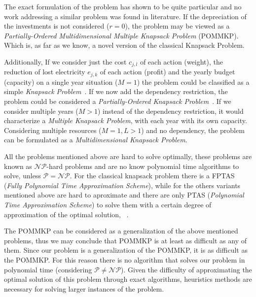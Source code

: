 The exact formulation of the problem has shown to be quite particular and
no work addressing a similar problem was found in literature.
If the depreciation of the investments is not considered ($r=0$),
the problem may  be viewed as a \textit{Partially-Ordered Multidimensional
Multiple Knapsack Problem} (POMMKP). Which is, as far as we know, a
novel version of the classical Knapsack Problem.

Additionally, If we consider just the cost $c_{j,l}$ of each action (weight), the
reduction of lost electricity  $e_{j,k}$ of each action (profit) and the yearly budget (capacity)
on a single year situation ($M=1$) the problem could be classified as a simple
\textit{Knapsack Problem}~\cite{pisinger1995}.
If we now add the dependency restriction, the problem could be considered
a \textit{Partially-Ordered Knapsack Problem}~\cite{pok2002}.
If we consider multiple years ($M > 1$) instead of the dependency restriction, it would characterize
a \textit{Multiple Knapsack Problem}, with each year with its own capacity.
Considering multiple resources ($M=1, L > 1$) and no dependency, the problem can be formulated as a
\textit{Multidimensional Knapsack Problem}.

All the problems mentioned above are hard to solve optimally, these problems are known 
as $\mathcal{NP}$-hard problems and are no know polynomial time algorithms to solve, unless $\mathcal{P} = \mathcal{NP}$.
For the classical knapsack problem there is a FPTAS (\textit{Fully Polynomial Time Approximation Scheme}),
while for the others variants mentioned above are hard to aproximate and there are only PTAS 
(\textit{Polynomial Time Approximation Scheme}) to solve them with a certain degree of 
approximation of the optimal solution, ~\cite{pok2002, puchinger2006core, dawande2000approximation}. 

The POMMKP can be considered as a generalization of the above mentioned problems,
thus we may conclude that POMMKP is at least as difficult as any of them.
Since our problem is a generalization of the POMMKP, it is as difficult as the POMMKP.
For this reason there is no algorithm that solves our problem in polynomial time (considering
$\mathcal{P} \ne \mathcal{NP}$).
Given the difficulty of approximating the optimal solution of this problem through exact algorithms, heuristics methods are necessary 
for solving larger instances of the problem.

